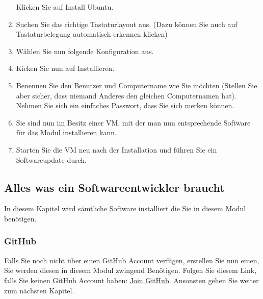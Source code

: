 \begin{frame}[fragile]
\begin{enumerate}
        Klicken Sie auf Install Ubuntu.
        \item Suchen Sie das richtige Tastaturlayout aus. (Dazu können Sie auch auf Tastaturbelegung automatisch erkennen klicken) \newpage
        \item Wählen Sie nun folgende Konfiguration aus.
        \item Kicken Sie nun auf Installieren.
        \item Benennen Sie den Benutzer und Computername wie Sie möchten (Stellen Sie aber sicher, dass niemand Anderes den gleichen Computernamen hat).
        Nehmen Sie sich ein einfaches Passwort, dass Sie sich merken können.
        \item Sie sind nun im Besitz einer VM, mit der man nun entsprechende Software für das Modul installieren kann.
        \item Starten Sie die VM neu nach der Installation und führen Sie ein Softwareupdate durch.
    \end{enumerate}
\end{frame}


\subsection{Alles was ein Softwareentwickler braucht}\label{subsec:software}
\begin{frame}[fragile]
    In diesem Kapitel wird sämtliche Software installiert die Sie in diesem Modul benötigen.
\end{frame}

\subsubsection{GitHub}\label{subsubsec:github}
\begin{frame}[fragile]
    Falls Sie noch nicht über einen GitHub Account verfügen, erstellen Sie nun einen, Sie werden diesen in diesem Modul
    zwingend Benötigen.
    Folgen Sie diesem Link, falls Sie keinen GitHub Account haben: \href{https://github.com/join}{Join GitHub}.
    Ansonsten gehen Sie weiter zum nächsten Kapitel.
\end{frame}
\newpage

